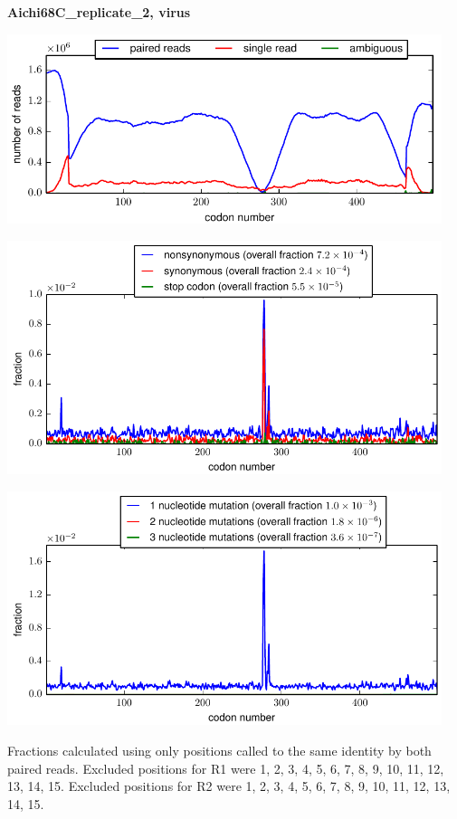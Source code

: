 \documentclass[10pt,letterpaper]{article}
\begin{document}
\centerline{\Large \bf Aichi68C\_replicate\_2, virus}
\vspace{0.1in}

\centerline{\includegraphics[width=5in]{Aichi68C_replicate_2_virus_codondepth.pdf}}
\vspace{0.1in}

\centerline{\includegraphics[width=5in]{Aichi68C_replicate_2_virus_syn-ns-dist.pdf}}
\vspace{0.1in}

\centerline{\includegraphics[width=5in]{Aichi68C_replicate_2_virus_nmutspercodon-dist.pdf}}
\vspace{0.1in}

Fractions calculated using only positions called to the same identity by both paired reads.  Excluded positions for R1 were 1, 2, 3, 4, 5, 6, 7, 8, 9, 10, 11, 12, 13, 14, 15. 
 Excluded positions for R2 were 1, 2, 3, 4, 5, 6, 7, 8, 9, 10, 11, 12, 13, 14, 15. 
\end{document}
